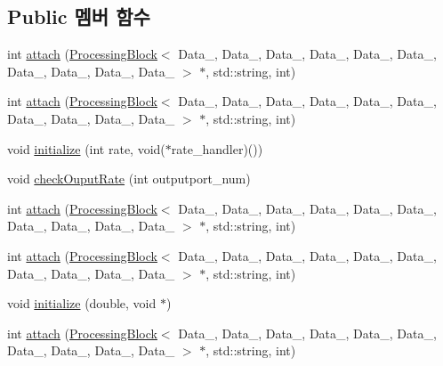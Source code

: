 \subsection*{Public 멤버 함수}
\begin{DoxyCompactItemize}
\item 
int \hyperlink{classOutputDataPort__PB_ac1c7e483c5d8d5c6b9891463b81e41a4}{attach} (\hyperlink{classProcessingBlock}{Processing\+Block}$<$ Data\+\_, Data\+\_, Data\+\_, Data\+\_, Data\+\_, Data\+\_, Data\+\_, Data\+\_, Data\+\_, Data\+\_ $>$ $\ast$, std\+::string, int)
\item 
int \hyperlink{classOutputDataPort__PB_ac1c7e483c5d8d5c6b9891463b81e41a4}{attach} (\hyperlink{classProcessingBlock}{Processing\+Block}$<$ Data\+\_, Data\+\_, Data\+\_, Data\+\_, Data\+\_, Data\+\_, Data\+\_, Data\+\_, Data\+\_, Data\+\_ $>$ $\ast$, std\+::string, int)
\item 
void \hyperlink{classOutputDataPort__PB_a7b98a0affb81a4c74a8dfc70eac515ba}{initialize} (int rate, void($\ast$rate\+\_\+handler)())
\item 
void \hyperlink{classOutputDataPort__PB_a724d73ba2910560c5e9c7916b95042b8}{check\+Ouput\+Rate} (int outputport\+\_\+num)
\item 
int \hyperlink{classOutputDataPort__PB_ac1c7e483c5d8d5c6b9891463b81e41a4}{attach} (\hyperlink{classProcessingBlock}{Processing\+Block}$<$ Data\+\_, Data\+\_, Data\+\_, Data\+\_, Data\+\_, Data\+\_, Data\+\_, Data\+\_, Data\+\_, Data\+\_ $>$ $\ast$, std\+::string, int)
\item 
int \hyperlink{classOutputDataPort__PB_ac1c7e483c5d8d5c6b9891463b81e41a4}{attach} (\hyperlink{classProcessingBlock}{Processing\+Block}$<$ Data\+\_, Data\+\_, Data\+\_, Data\+\_, Data\+\_, Data\+\_, Data\+\_, Data\+\_, Data\+\_, Data\+\_ $>$ $\ast$, std\+::string, int)
\item 
void \hyperlink{classOutputDataPort__PB_a8964ddb803ff23f6753b90cfc781c636}{initialize} (double, void $\ast$)
\item 
int \hyperlink{classOutputDataPort__PB_ac1c7e483c5d8d5c6b9891463b81e41a4}{attach} (\hyperlink{classProcessingBlock}{Processing\+Block}$<$ Data\+\_, Data\+\_, Data\+\_, Data\+\_, Data\+\_, Data\+\_, Data\+\_, Data\+\_, Data\+\_, Data\+\_ $>$ $\ast$, std\+::string, int)
\end{DoxyCompactItemize}
